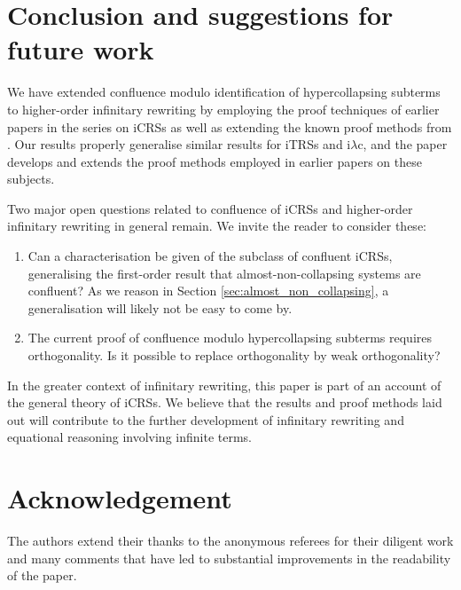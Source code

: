 \documentclass{LMCS}
\theoremstyle{plain}
\theoremstyle{definition}
\newcommand{\iLC}{i$\lambda$c\xspace}
\begin{document}
\section{Conclusion and suggestions for future work}
\label{sec:conclusion}

\noindent We have extended confluence modulo identification of
hypercollapsing subterms to higher-order infinitary rewriting by
employing the proof techniques of earlier papers in the series on
iCRSs as well as extending the known proof methods from
\cite{T03_KV}. Our results properly generalise similar results for
iTRSs and \iLC, and the paper develops and extends the proof methods
employed in earlier papers on these subjects.

Two major open questions related to confluence of iCRSs and higher-order infinitary rewriting in general remain. We invite the reader to consider these: 

\begin{enumerate}[$\bullet$]

\item Can a characterisation be given of the subclass of confluent iCRSs, generalising the first-order result that almost-non-collapsing systems are confluent? As we reason in Section \ref{sec:almost_non_collapsing}, a generalisation will likely not be easy to come by.

\item The current proof of confluence modulo hypercollapsing subterms requires
orthogonality. Is it possible to replace orthogonality
by weak orthogonality?

\end{enumerate}

In the greater context of infinitary rewriting, this paper is part of an account of the general theory of iCRSs. We believe that the results and proof methods laid out will contribute to the further development of infinitary rewriting and equational reasoning involving infinite terms.

\section*{Acknowledgement}

\noindent The authors extend their thanks to the anonymous referees
for their diligent work and many comments that have led to substantial
improvements in the readability of the paper.




\end{document}
